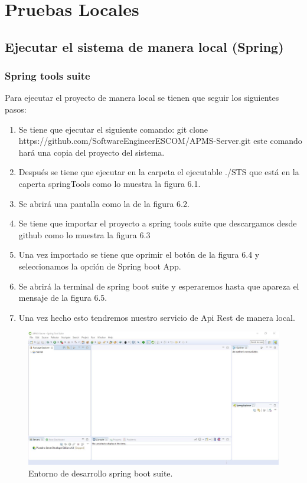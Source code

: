 \chapter{Pruebas Locales}

\section{Ejecutar el sistema de manera local (Spring)}

\subsection{Spring tools suite}
Para ejecutar el proyecto de manera local se tienen que seguir los siguientes pasos:
\begin{enumerate}
    \item Se tiene que ejecutar el siguiente comando: git clone https://github.com/SoftwareEngineerESCOM/APMS-Server.git este comando hará una copia del proyecto del sistema.
    \item Después se tiene que ejecutar en la carpeta el ejecutable ./STS que está en la caperta springTools como lo muestra la figura 6.1.
    \item Se abrirá una pantalla como la de la figura 6.2.
    \item Se tiene que importar el proyecto a spring tools suite que descargamos desde github como lo muestra la figura 6.3
    \item Una vez importado se tiene que oprimir el botón de la figura 6.4 y seleccionamos la opción de Spring boot App.
    \item Se abrirá la terminal de spring boot suite y esperaremos hasta que apareza el mensaje de la figura 6.5.
    \item Una vez hecho esto tendremos nuestro servicio de Api Rest de manera local.
\end{enumerate}


\begin{figure}[H]
	\centering
	\includegraphics[width=0.7\linewidth]{images/tecnologias/spring.JPG}
	\caption{Entorno de desarrollo spring boot suite.}
\end{figure}


